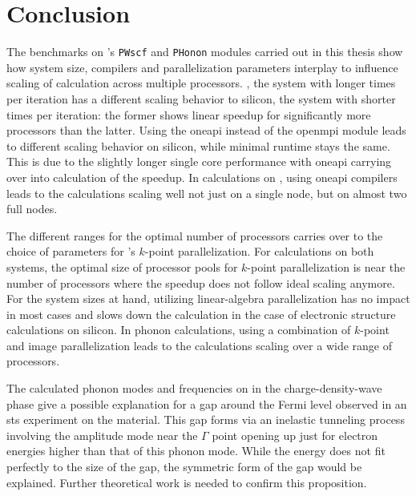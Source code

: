 \documentclass[main.tex]{subfiles}
\begin{document}
\chapter{Conclusion}

The benchmarks on \QE's \texttt{PWscf} and \texttt{PHonon} modules carried out in this thesis show how system size, compilers and parallelization parameters interplay to influence scaling of calculation across multiple processors.
\TaS, the system with longer times per iteration has a different scaling behavior to silicon, the system with shorter times per iteration:
the former shows linear speedup for significantly more processors than the latter.
Using the \gls{oneapi} instead of the \gls{openmpi} module leads to different scaling behavior on silicon, while minimal runtime stays the same.
This is due to the slightly longer single core performance with \gls{oneapi} carrying over into calculation of the speedup.
In calculations on \TaS, using \gls{oneapi} compilers leads to the calculations scaling well not just on a single node, but on almost two full nodes.

The different ranges for the optimal number of processors carries over to the choice of parameters for \QE's \(k\)-point parallelization.
For calculations on both systems, the optimal size of processor pools for \(k\)-point parallelization is near the number of processors where the speedup does not follow ideal scaling anymore.
For the system sizes at hand, utilizing linear-algebra parallelization has no impact in most cases and slows down the calculation in the case of electronic structure calculations on silicon.
In phonon calculations, using a combination of \(k\)-point and image parallelization leads to the calculations scaling over a wide range of processors.

The calculated phonon modes and frequencies on \TaS in the charge-density-wave phase give a possible explanation for a gap around the Fermi level observed in an \acrshort{sts} experiment on the material.
This gap forms via an inelastic tunneling process involving the amplitude mode near the \(\Gamma\) point opening up just for electron energies higher than that of this phonon mode.
While the energy does not fit perfectly to the size of the gap, the symmetric form of the gap would be explained.
Further theoretical work is needed to confirm this proposition.
\end{document}
